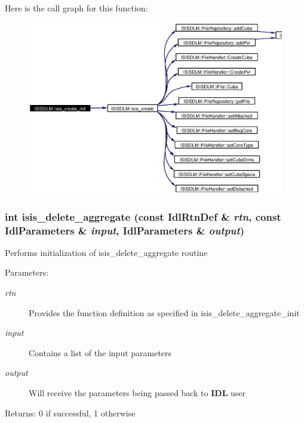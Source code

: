 Here is the call graph for this function:\begin{figure}[H]
\begin{center}
\leavevmode
\includegraphics[width=349pt]{namespaceISISDLM_a13_cgraph}
\end{center}
\end{figure}
\subsubsection{\setlength{\rightskip}{0pt plus 5cm}int isis\_\-delete\_\-aggregate (const Idl\-Rtn\-Def \& {\em rtn}, const Idl\-Parameters \& {\em input}, Idl\-Parameters \& {\em output})}\label{namespaceISISDLM_a16}


Performs initialization of isis\_\-delete\_\-aggregate routine \begin{Desc}
\item[Parameters:]
\begin{description}
\item[{\em rtn}]Provides the function definition as specified in isis\_\-delete\_\-aggregate\_\-init \item[{\em input}]Contains a list of the input parameters \item[{\em output}]Will receive the parameters being passed back to {\bf IDL} user \end{description}
\end{Desc}
\begin{Desc}
\item[Returns:]0 if successful, 1 otherwise \end{Desc}
